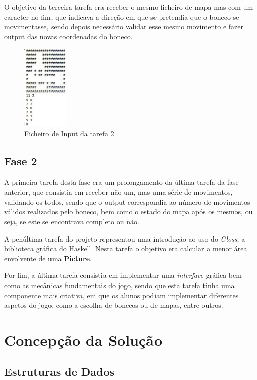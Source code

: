 \documentclass[a4paper]{article}
\begin{document}
O objetivo da terceira tarefa era receber o mesmo ficheiro de mapa mas com um caracter no fim, que indicava a direção em que se pretendia que o boneco se movimentasse, sendo depois necessário validar esse mesmo movimento e fazer output das novas coordenadas do boneco.

\begin{figure}[ht]
	\centering
	\includegraphics[width=0.2\textwidth]{assets/mapaMovimento.jpg}
	\caption{Ficheiro de Input da tarefa 2}
\end{figure}

\subsection{Fase 2}
A primeira tarefa desta fase era um prolongamento da última tarefa da fase anterior, que consistia em receber não um, mas uma série de movimentos, validando-os todos, sendo que o output correspondia ao número de movimentos válidos realizados pelo boneco, bem como o estado do mapa após os mesmos, ou seja, se este se encontrava completo ou não.

A penúltima tarefa do projeto representou uma introdução ao uso do \emph{Gloss}, a biblioteca gráfica do Haskell. Nesta tarefa o objetivo era calcular a menor área envolvente de uma \textbf{Picture}. 

Por fim, a última tarefa consistia em implementar uma \textit{interface} gráfica bem como as mecânicas fundamentais do jogo, sendo que esta tarefa tinha uma componente mais criativa, em que os alunos podiam implementar diferentes aspetos do jogo, como a escolha de bonecos ou de mapas, entre outros.


\section{Concepção da Solução}
\label{sec:solucao}

\subsection{Estruturas de Dados}
\end{document}
